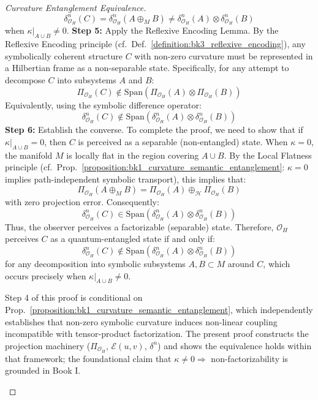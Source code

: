 \begin{proof}[Curvature Entanglement Equivalence]
\begin{equation}
\delta^n_{\mathcal{O}_H}(C) = \delta^n_{\mathcal{O}_H}(A \oplus_M B) \neq \delta^n_{\mathcal{O}_H}(A) \otimes \delta^n_{\mathcal{O}_H}(B)
\end{equation}
when $\kappa|_{A \cup B} \neq 0$.
\textbf{Step 5:} Apply the Reflexive Encoding Lemma.
By the Reflexive Encoding principle (cf.~Def.~\ref{definition:bk3_reflexive_encoding}), any symbolically coherent structure $C$ with non-zero curvature must be represented in a Hilbertian frame as a non-separable state. Specifically, for any attempt to decompose $C$ into subsystems $A$ and $B$:
\begin{equation}
\Pi_{\mathcal{O}_H}(C) \notin \text{Span}(\Pi_{\mathcal{O}_H}(A) \otimes \Pi_{\mathcal{O}_H}(B))
\end{equation}
Equivalently, using the symbolic difference operator:
\begin{equation}
\delta^n_{\mathcal{O}_H}(C) \notin \text{Span}(\delta^n_{\mathcal{O}_H}(A) \otimes \delta^n_{\mathcal{O}_H}(B))
\end{equation}
\textbf{Step 6:} Establish the converse.
To complete the proof, we need to show that if $\kappa|_{A \cup B} = 0$, then $C$ is perceived as a separable (non-entangled) state. When $\kappa = 0$, the manifold $M$ is locally flat in the region covering $A \cup B$. By the Local Flatness principle (cf.~Prop.~\ref{proposition:bk1_curvature_semantic_entanglement}: $\kappa=0$ implies path-independent symbolic transport), this implies that:
\begin{equation}
\Pi_{\mathcal{O}_H}(A \oplus_M B) = \Pi_{\mathcal{O}_H}(A) \oplus_{\mathcal{H}} \Pi_{\mathcal{O}_H}(B)
\end{equation}
with zero projection error. Consequently:
\begin{equation}
\delta^n_{\mathcal{O}_H}(C) \in \text{Span}(\delta^n_{\mathcal{O}_H}(A) \otimes \delta^n_{\mathcal{O}_H}(B))
\end{equation}
Thus, the observer perceives a factorizable (separable) state.
Therefore, $\mathcal{O}_H$ perceives $C$ as a quantum-entangled state if and only if:
\begin{equation}
\delta^n_{\mathcal{O}_H}(C) \notin \text{Span}(\delta^n_{\mathcal{O}_H}(A) \otimes \delta^n_{\mathcal{O}_H}(B))
\end{equation}
for any decomposition into symbolic subsystems $A, B \subset M$ around $C$, which occurs precisely when $\kappa|_{A \cup B} \neq 0$.
\begin{remark}
Step 4 of this proof is conditional on Prop.~\ref{proposition:bk1_curvature_semantic_entanglement}, which independently establishes that non-zero symbolic curvature induces non-linear coupling incompatible with tensor-product factorization. The present proof constructs the projection machinery ($\Pi_{\mathcal{O}_H}$, $\mathcal{E}(u,v)$, $\delta^n$) and shows the equivalence holds within that framework; the foundational claim that $\kappa \neq 0 \Rightarrow$ non-factorizability is grounded in Book I.
\end{remark}
\end{proof}
